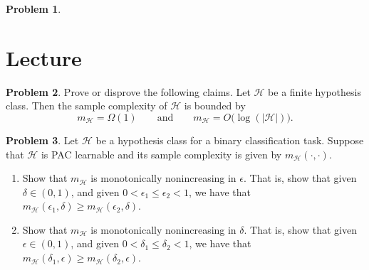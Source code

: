 \documentclass[10pt]{article}
\theoremstyle{definition}
\newtheorem{problem}{Problem}
\DeclareMathOperator{\E}{\mathbb E}
\begin{document}
\begin{problem}
\begin{enumerate}
    \end{enumerate}
\end{problem}


\newpage
\section{Lecture}

\begin{problem}
    Prove or disprove the following claims.
    Let $\mathcal H$ be a finite hypothesis class.
    Then the sample complexity of $\mathcal H$ is bounded by
    \begin{equation}
        m_\mathcal H = \Omega(1)
        \qquad\text{and}\qquad
        m_\mathcal H = O\bigg(\log(|\mathcal H|)\bigg)
        .
    \end{equation}
    \vspace{3in}
\end{problem}

\newpage
\begin{problem}
    Let $\mathcal H$ be a hypothesis class for a binary classification task.
    Suppose that $\mathcal H$ is PAC learnable and its sample complexity is given by $m_\mathcal H(\cdot,\cdot)$.
    \begin{enumerate}
        \item
        Show that $m_\mathcal H$ is monotonically nonincreasing in $\epsilon$.
        That is, show that given $\delta\in(0,1)$, and given $0 < \epsilon_1 \le \epsilon_2 < 1$,
        we have that $m_\mathcal H(\epsilon_1, \delta) \ge m_\mathcal H(\epsilon_2,\delta)$.
            \vspace{4in}

        \item
        Show that $m_\mathcal H$ is monotonically nonincreasing in $\delta$.
        That is, show that given $\epsilon\in(0,1)$, and given $0 < \delta_1 \le \delta_2 < 1$,
        we have that $m_\mathcal H(\delta_1, \epsilon) \ge m_\mathcal H(\delta_2,\epsilon)$.
    \end{enumerate}
    \vspace{3in}
\end{problem}
\end{document}
